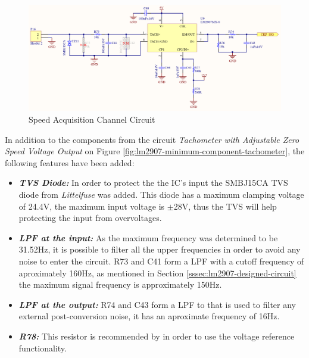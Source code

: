 			\begin{figure}[htbp]
				\centering
				\includegraphics[width=1\textwidth]{figuras/fig-ckp-conditioning-circuit.png}
				\caption{Speed Acquisition Channel Circuit}
				\label{fig:ckp-conditioning-circuit}
			\end{figure}

			In addition to the components from the circuit \textit{Tachometer with Adjustable Zero Speed Voltage Output} on Figure \ref{fig:lm2907-minimum-component-tachometer}, the following features have been added:

			\begin{itemize}
				\item\textit{\textbf{TVS Diode:}} In order to protect the the IC's input the SMBJ15CA TVS diode from \textit{Littelfuse} was added. This diode has a maximum clamping voltage of 24.4V, the maximum input voltage is $\pm$28V, thus the TVS will help protecting the input from overvoltages.\label{itm:ckp-circuit-tvs}
				\item\textit{\textbf{LPF at the input:}} As the maximum frequency was determined to be 31.52Hz, it is possible to filter all the upper frequencies in order to avoid any noise to enter the circuit. R73 and C41 form a LPF with a cutoff frequency of aproximately 160Hz, as mentioned in Section \ref{sssec:lm2907-designed-circuit} the maximum signal frequency is approximately 150Hz.
				\item\textit{\textbf{LPF at the output:}} R74 and C43 form a LPF to that is used to filter any external post-conversion noise, it has an aproximate frequency of 16Hz.\label{itm:ckp-circuit-lpf-output} 
				\item\textit{\textbf{R78:}} This resistor is recommended by \cite{lm2907-datasheet} in order to use the voltage reference functionality.
			\end{itemize}

